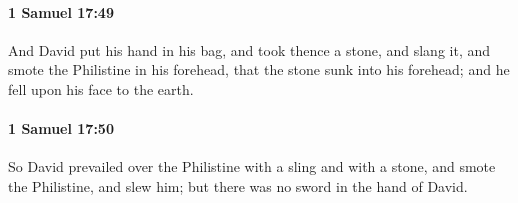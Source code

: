 		\paragraph{1 Samuel 17:49} %
			\label{1SAMUEL-17-49}

			And David put his hand in his bag, and took thence a stone, and slang it, and smote the Philistine in his forehead, that the stone sunk into his forehead; and he fell upon his face to the earth.


		\paragraph{1 Samuel 17:50} %
			\label{1SAMUEL-17-50}

			So David prevailed over the Philistine with a sling and with a stone, and smote the Philistine, and slew him; but there was no sword in the hand of David.



